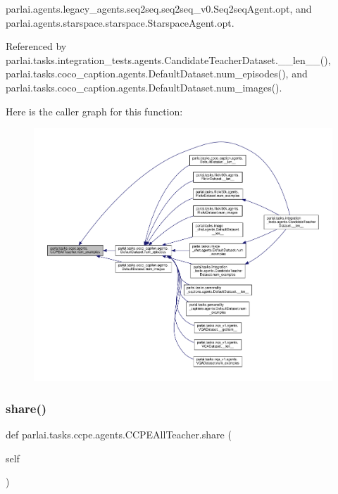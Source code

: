 parlai.\+agents.\+legacy\+\_\+agents.\+seq2seq.\+seq2seq\+\_\+v0.\+Seq2seq\+Agent.\+opt, and parlai.\+agents.\+starspace.\+starspace.\+Starspace\+Agent.\+opt.



Referenced by parlai.\+tasks.\+integration\+\_\+tests.\+agents.\+Candidate\+Teacher\+Dataset.\+\_\+\+\_\+len\+\_\+\+\_\+(), parlai.\+tasks.\+coco\+\_\+caption.\+agents.\+Default\+Dataset.\+num\+\_\+episodes(), and parlai.\+tasks.\+coco\+\_\+caption.\+agents.\+Default\+Dataset.\+num\+\_\+images().

Here is the caller graph for this function\+:
\nopagebreak
\begin{figure}[H]
\begin{center}
\leavevmode
\includegraphics[width=350pt]{classparlai_1_1tasks_1_1ccpe_1_1agents_1_1CCPEAllTeacher_aa0cd16c6ebf2fa6bc0c8ad2e449445de_icgraph}
\end{center}
\end{figure}
\mbox{\label{classparlai_1_1tasks_1_1ccpe_1_1agents_1_1CCPEAllTeacher_ab1b9d65d88c950391175472d72694f80}} 
\subsubsection{\texorpdfstring{share()}{share()}}
{\footnotesize\ttfamily def parlai.\+tasks.\+ccpe.\+agents.\+C\+C\+P\+E\+All\+Teacher.\+share (\begin{DoxyParamCaption}\item[{}]{self }\end{DoxyParamCaption})}



